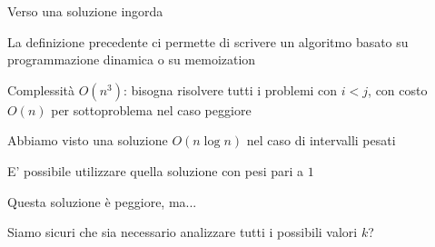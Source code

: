 \begin{frame}{Verso una soluzione ingorda}

\vspace{-9pt}
\begin{myboxtitle}
\BI
\item La definizione precedente ci permette di scrivere un algoritmo basato su
programmazione dinamica o su memoization
\item Complessità $O(n^3)$: bisogna risolvere tutti i problemi con $i<j$, con
costo $O(n)$ per sottoproblema nel caso peggiore
\EI
\end{myboxtitle}

\begin{myboxtitle}
\BI
\item Abbiamo visto una soluzione $O(n \log n)$ nel caso di intervalli pesati
\item E' possibile utilizzare quella soluzione con pesi pari a $1$
\item Questa soluzione è peggiore, ma...
\item Siamo sicuri che sia necessario analizzare tutti i possibili valori $k$? 
\EI
\end{myboxtitle}

\end{frame}

